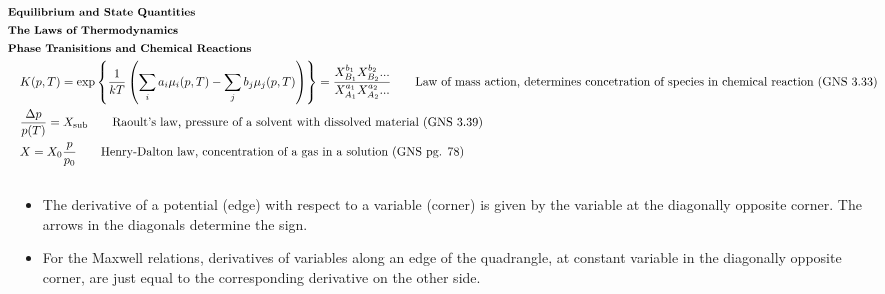 \documentclass[10pt]{article}
\newcommand{\lrp}[1]{\left( #1 \right)}
\newcommand{\lrc}[1]{\left\{ #1 \right\}}
\begin{document}
\begin{multicols}{2}
	\tiny
	\setlength{\abovedisplayskip}{-25pt}
	\setlength{\belowdisplayskip}{-25pt}
	\setlength{\abovedisplayshortskip}{0pt}
	\setlength{\belowdisplayshortskip}{0pt}
	\begin{align*}
	& \small \hspace{-10pt} \textbf{Equilibrium and State Quantities} \small \\
	& \small \hspace{-10pt} \textbf{The Laws of Thermodynamics} \small \\	
	& \small \hspace{-10pt} \textbf{Phase Tranisitions and Chemical Reactions} \small \\
		& K(p,T) = \exp \lrc{\frac{1}{kT} \lrp{\sum_i a_i \mu_i(p,T) - \sum_j b_j \mu_j(p,T)}} = \frac{X_{B_1}^{b_1} X_{B_2}^{b_2}...}{X_{A_1}^{a_1} X_{A_2}^{a_2}...} \tag*{Law of mass action, determines concetration of species in chemical reaction (GNS 3.33)} \\
		& \frac{\Delta p}{p(T)} = X_{\text{sub}}	\tag*{Raoult's law, pressure of a solvent with dissolved material (GNS 3.39)} \\
		& X = X_0 \frac{p}{p_0}		\tag*{Henry-Dalton law, concentration of a gas in a solution (GNS pg. 78)} \\		






	\end{align*} \linebreak
	\setlength{\abovedisplayskip}{-25pt}
	\setlength{\belowdisplayskip}{-10pt}
	\setlength{\abovedisplayshortskip}{0pt}
	\setlength{\belowdisplayshortskip}{0pt}
	\begin{align*} 









	\end{align*}
	
	\begin{minipage}{0.3 \columnwidth}
		
	\end{minipage}
	\begin{minipage}{0.65 \columnwidth}
		\begin{itemize}
			\item The derivative of a potential (edge) with respect to a variable (corner) is given by the variable at the diagonally opposite corner. The arrows in the diagonals determine the sign. \\
			\item For the Maxwell relations, derivatives of variables along an edge of the quadrangle, at constant variable in the diagonally opposite corner, are just equal to the corresponding derivative on the other side.
		\end{itemize}
	\end{minipage}
	

\end{multicols}
\end{document}
